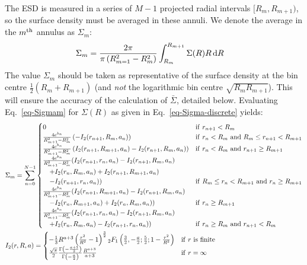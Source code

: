 \documentclass{article}
\begin{document}
The ESD is measured in a series of $M-1$ projected radial intervals $[R_m, R_{m+1})$, so the surface density must be averaged in these annuli. We denote the average in the $m^{\rm th}$ annulus as $\Sigma_m$:
\begin{align}
  \Sigma_m &= \frac{2\pi}{\pi\left(R_{m=1}^2-R_m^2\right)}\int_{R_m}^{R_{m+1}}\Sigma(R)R\,{\rm d}R \label{eq-Sigmam}
\end{align}
The value $\Sigma_m$ should be taken as representative of the surface density at the bin centre $\frac{1}{2}\left(R_m+R_{m+1}\right)$ (and \emph{not} the logarithmic bin centre $\sqrt{R_mR_{m+1}}$). This will ensure the accuracy of the calculation of $\bar{\Sigma}$, detailed below. Evaluating Eq.~\ref{eq-Sigmam} for $\Sigma(R)$ as given in Eq.~\ref{eq-Sigma-discrete} yields:
\begin{align}
  &\Sigma_m = \sum_{n=0}^{N-1}
  \begin{cases}
    0 & {\rm if}\ r_{n+1} < R_m\\
    \frac{4e^{b_n}}{R_{m+1}^2-R_m^2} \left(-I_2(r_{n+1},R_m,a_n)\right) & {\rm if}\ r_n < R_m\ {\rm and}\ R_m \leq r_{n+1} < R_{m+1}\\
    \frac{4e^{b_n}}{R_{m+1}^2-R_m^2} \left(I_2(r_{n+1},R_{m+1},a_n)-I_2(r_{n+1},R_m,a_n)\right) & {\rm if}\ r_n < R_m\ {\rm and}\ r_{n+1} \geq R_{m+1}\\
    \frac{4e^{b_n}}{R_{m+1}^2-R_m^2} (I_2(r_{n+1},r_n,a_n)-I_2(r_{n+1},R_m,a_n)\\ \quad +I_2(r_n,R_m,a_n)+I_2(r_{n+1},R_{m+1},a_n)\\ \quad -I_2(r_{n+1},r_n,a_n)) & {\rm if}\ R_m \leq r_n < R_{m+1}\ {\rm and}\ r_n \geq R_{m+1}\\
    \frac{4e^{b_n}}{R_{m+1}^2-R_m^2} (I_2(r_{n+1},R_{m+1},a_n)-I_2(r_{n+1},R_m,a_n)\\ \quad -I_2(r_n,R_{m+1},a_n)+I_2(r_n,R_m,a_n)) & {\rm if}\ r_n \geq R_{m+1}\\
    \frac{4e^{b_n}}{R_{m+1}^2-R_m^2} (I_2(r_{n+1},r_n,a_n)-I_2(r_{n+1},R_m,a_n)\\ \quad +I_2(r_n,R_m,a_n)-I_2(r_{n+1},r_n,a_n)) & {\rm if}\ r_n \geq R_m\ {\rm and}\ r_{n+1} < R_m\\
  \end{cases}\\
  &I_2(r,R,a) =
  \begin{cases}
    -\frac{1}{3}R^{a+3}\left(\frac{r^2}{R^2}-1\right)^{\frac{3}{2}}{}_2F_1\left(\frac{3}{2},-\frac{a}{2};\frac{5}{2};1-\frac{r^2}{R^2}\right) & {\rm if}\ r\ {\rm is}\ {\rm finite}\\
    \frac{\sqrt{\pi}}{2}\frac{\Gamma\left(-\frac{a+1}{2}\right)}{\Gamma\left(-\frac{a}{2}\right)}\frac{R^{a+3}}{a+3} & {\rm if}\ r=\infty
  \end{cases}
\end{align}
\end{document}
